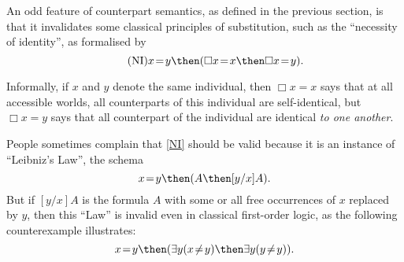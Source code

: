 \documentclass[11pt]{woarticle}
\newcommand{\cmnt}[1]{\iffalse #1 \fi}
\theoremstyle{break}
\theoremstyle{nonumberplain}
\newcommand{\1}{\;\,|\;\,}
\begin{document}
An odd feature of counterpart semantics, as defined in the previous section, is
that it invalidates some classical principles of substitution, such as the
``necessity of identity'', as formalised by
\begin{equation}\tag{NI}\label{NI}
  x\!=\!y \then (\Box x\!=\!x \then \Box x\!=\!y).
\end{equation}

Informally, if $x$ and $y$ denote the same individual, then $\Box x\!=\!x$ says
that at all accessible worlds, all counterparts of this individual are
self-identical, but $\Box x\!=\!y$ says that all counterpart of the individual
are identical \emph{to one another}.

\cmnt{%
  In the pair
  \begin{gather}
    x\!=\!y \then \Box Gxy \then \Box Gyy;\\
    x\!=\!y \then \Diamond Gxy \then \Diamond Gyy,\label{ex.ll-diamond}
  \end{gather}
  only the first sentence is valid. As Lewis \citey{lewis83psct} observed, in
  counterpart semantics modal operators effectively function as unselective
  binders of all variables in their scope.

  Informally, suppose $x$ and $y$ pick out the same individual $d$ at $w$, and
  this individual has two counterparts $d_{1}$ and $d_{2}$ at the only accessible
  world $w'$. When the point of evaluation is shifted from $w$ to $w'$, the
  semantic value of every variable shifts to a counterpart of its previous value.
  $\Box A$ says that $A$ is true at all accessible worlds under all such shifts.
  Thus $\Box Gxx$ is true at $w$ iff at $w'$, $d_{1}$ is $G$-related to itself
  \emph{and} $d_{2}$ is $G$-related to itself. $\Box Gxy$ requires, in addition,
  that $d_{1}$ and $d_{2}$ are $G$-related to one another. Conversely,
  $\Diamond G xy$ is true at $w$ iff there is a $G$-instance in
  $\{ d_{1}, d_{2} \}$. $\Diamond Gxy$ requires, more specifically, that either
  $d_{1}Gd_{1}$ or $d_{2}Gd_{2}$. We might say that the substituted variable $y$
  in \eqref{ex.ll-diamond} gets captured by the other occurrence of $y$ in the
  scope of the diamond.
} %

People sometimes complain that \eqref{NI} should be valid because it is an
instance of ``Leibniz's Law'', the schema
\begin{equation*}
  x\!=\!y \then (A \then [y/x]A).
\end{equation*}
But if $[y/x]A$ is the formula $A$ with some or all free occurrences of $x$
replaced by $y$, then this ``Law'' is invalid even in classical first-order
logic, as the following counterexample illustrates:
\begin{equation}\label{ex.ll}
  x\!=\!y \then (\exists y(x\!\not=\!y) \then \exists y(y\!\not=\!y)).
\end{equation}
\end{document}

